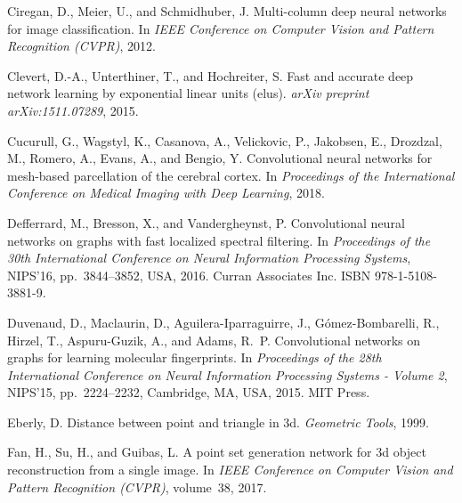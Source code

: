 \documentclass{article}
\begin{document}
\begin{thebibliography}{59}
Ciregan, D., Meier, U., and Schmidhuber, J.
\newblock Multi-column deep neural networks for image classification.
\newblock In \emph{IEEE Conference on Computer Vision and Pattern Recognition
  (CVPR)}, 2012.

Clevert, D.-A., Unterthiner, T., and Hochreiter, S.
\newblock Fast and accurate deep network learning by exponential linear units
  (elus).
\newblock \emph{arXiv preprint arXiv:1511.07289}, 2015.

Cucurull, G., Wagstyl, K., Casanova, A., Velickovic, P., Jakobsen, E.,
  Drozdzal, M., Romero, A., Evans, A., and Bengio, Y.
\newblock Convolutional neural networks for mesh-based parcellation of the
  cerebral cortex.
\newblock In \emph{Proceedings of the International Conference on Medical
  Imaging with Deep Learning}, 2018.

Defferrard, M., Bresson, X., and Vandergheynst, P.
\newblock Convolutional neural networks on graphs with fast localized spectral
  filtering.
\newblock In \emph{Proceedings of the 30th International Conference on Neural
  Information Processing Systems}, NIPS'16, pp.\  3844--3852, USA, 2016. Curran
  Associates Inc.
\newblock ISBN 978-1-5108-3881-9.

Duvenaud, D., Maclaurin, D., Aguilera-Iparraguirre, J., G\'{o}mez-Bombarelli,
  R., Hirzel, T., Aspuru-Guzik, A., and Adams, R.~P.
\newblock Convolutional networks on graphs for learning molecular fingerprints.
\newblock In \emph{Proceedings of the 28th International Conference on Neural
  Information Processing Systems - Volume 2}, NIPS'15, pp.\  2224--2232,
  Cambridge, MA, USA, 2015. MIT Press.

Eberly, D.
\newblock Distance between point and triangle in 3d.
\newblock \emph{Geometric Tools}, 1999.

Fan, H., Su, H., and Guibas, L.
\newblock A point set generation network for 3d object reconstruction from a
  single image.
\newblock In \emph{IEEE Conference on Computer Vision and Pattern Recognition
  (CVPR)}, volume~38, 2017.


\end{thebibliography}
\end{document}
